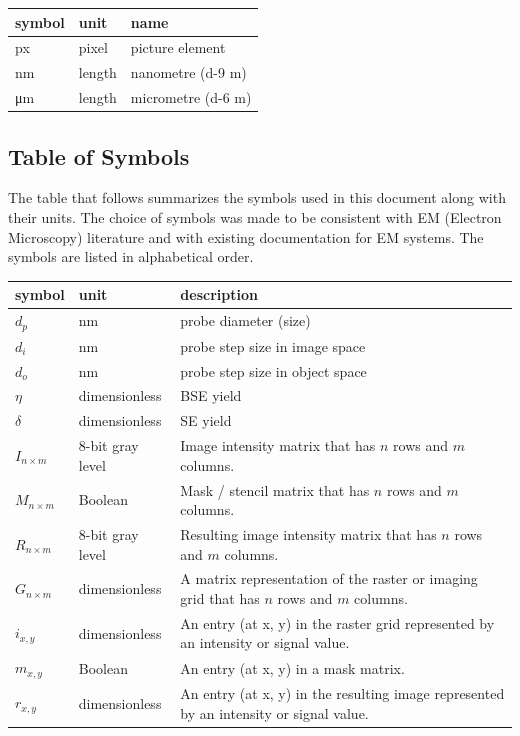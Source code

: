 \documentclass[12pt]{article}
\begin{document}
  \noindent \begin{tabular}{l l l} 
    \toprule		
    \textbf{symbol} & \textbf{unit} & \textbf{name}\\
    \midrule
    px & pixel & picture element \\
    \si{\nm} & length & nanometre (\num{d-9} m)\\
    \si{\um} & length & micrometre (\num{d-6} m)\\
    \bottomrule
  \end{tabular}

\subsection{Table of Symbols}

The table that follows summarizes the symbols used in this document along with
their units. The choice of symbols was made to be consistent with EM (Electron
Microscopy) literature and with existing documentation for EM systems. 
The symbols are listed in alphabetical order.

\renewcommand{\arraystretch}{1.2}
\noindent \begin{longtable*}{l l p{12cm}} \toprule
\textbf{symbol} & \textbf{unit} & \textbf{description}\\
\midrule 
$d_p$ & \si[per-mode=symbol] {\nm} & probe diameter (size)\\
$d_i$ & \si[per-mode=symbol] {\nm} & probe step size in image space\\
$d_o$ & \si[per-mode=symbol] {\nm} & probe step size in object space\\
$\eta$ & dimensionless & BSE yield \\
$\delta$ & dimensionless & SE yield \\
$I_{n\times m}$ & 8-bit gray level & Image intensity matrix that has $n$ rows and $m$ columns.\\
$M_{n\times m}$ & Boolean & Mask / stencil matrix that has $n$ rows and $m$ columns.\\
$R_{n\times m}$ & 8-bit gray level & Resulting image intensity matrix that has $n$ rows and $m$ columns.\\
$G_{n\times m}$ & dimensionless & A matrix representation of the raster or imaging grid that has $n$ rows and $m$ columns.\\
$i_{x,y}$ & dimensionless & An entry (at x, y) in the raster grid represented by an intensity or signal value.\\
$m_{x,y}$ & Boolean & An entry (at x, y) in a mask matrix.\\
$r_{x,y}$ & dimensionless & An entry (at x, y) in the resulting image represented by an intensity or signal value.\\
\bottomrule
\end{longtable*}
\end{document}
